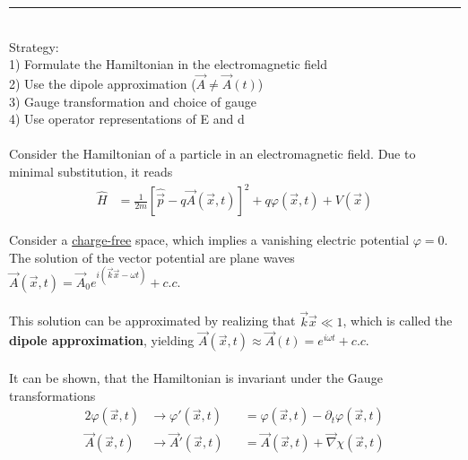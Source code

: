 \documentclass{article}
\newcommand{\lreck}[1]{\left[#1\right]}
\begin{document}
{\color{violet}
\hrule
	\\
	Strategy:\\
	1) Formulate the Hamiltonian in the electromagnetic field \\
	2) Use the dipole approximation ($\vec{A} \neq \vec{A}(t)$) \\
	3) Gauge transformation and choice of gauge \\
	4) Use operator representations of E and d\\
	\\
	Consider the Hamiltonian of a particle in an electromagnetic field. Due to minimal substitution, it reads
		\begin{align*}
			\hat{H} &= \frac{1}{2m} \lreck{ \hat{\vec{p}} - q\vec{A}(\vec{x},t) }^2 + q\varphi(\vec{x},t) + V(\vec{x})
		\end{align*}
	
	Consider a \underline{charge-free} space, which implies a vanishing electric potential $\varphi=0$.\\
	The solution of the vector potential are plane waves $\vec{A}(\vec{x},t) = \vec{A}_0 e^{i(\vec{k}\vec{x} - \omega t)} + c.c.$\\
	\\
	This solution can be approximated by realizing that $\vec{k}\vec{x} \ll 1$, which is called the \textbf{dipole approximation}, yielding $\vec{A}(\vec{x},t) \approx \vec{A}(t) = e^{i\omega t} + c.c.$\\
	\\
	It can be shown, that the Hamiltonian is invariant under the Gauge transformations
		\begin{alignat*}{2}
			\varphi(\vec{x},t) & \to \varphi'(\vec{x},t) &&= \varphi(\vec{x},t) - \partial_t \varphi(\vec{x},t) \\
			\vec{A}(\vec{x},t) & \to \vec{A}'(\vec{x},t) &&= \vec{A}(\vec{x},t) + \vec{\nabla} \chi(\vec{x},t)
		\end{alignat*}

}
\end{document}
